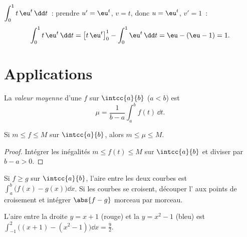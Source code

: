 \begin{example}\label{ex:g12:integ:ibp}
$\displaystyle\int_0^1 t\,\eu^{t}\,\dd t$~: prendre $u' = \eu^t$, $v = t$,
donc $u = \eu^t$, $v' = 1$~:
\[
\int_0^1 t\,\eu^t\,\dd t = \bigl[t\,\eu^t\bigr]_0^1 - \int_0^1 \eu^t\,\dd t
= \eu - (\eu - 1) = 1 .
\]
\end{example}

\section{Applications}

\begin{definition}\label{def:g12:integ:mean}
La \emph{valeur moyenne} d'une   $f$
sur $\intcc{a}{b}$ ($a<b$) est
\[
\mu = \frac{1}{b-a}\int_a^b f(t)\,\dd t .
\]
\end{definition}

\begin{proposition}\label{prop:g12:integ:meanbounds}
Si $m \leq f \leq M$ sur $\intcc{a}{b}$, alors $m \leq \mu \leq M$.
\end{proposition}

\begin{proof}
Intégrer les inégalités $m \leq f(t) \leq M$ sur $\intcc{a}{b}$ et
diviser par $b - a > 0$.
\end{proof}

\begin{method}\label{met:g12:integ:areabetween}
Si $f \geq g$ sur $\intcc{a}{b}$, l'aire entre les deux courbes est
$\int_a^b \bigl(f(x) - g(x)\bigr)\dd x$. Si les courbes se croisent,
découper l' aux points de croisement et intégrer $\abs{f - g}$
morceau par morceau.
\end{method}

\begin{omfigure}

{\small L'aire entre la droite $y = x + 1$ (rouge) et la 
$y = x^2 - 1$ (bleu) est $\int_{-1}^{2}
\bigl((x+1) - (x^2-1)\bigr)\dd x = \frac92$.}
\end{omfigure}

